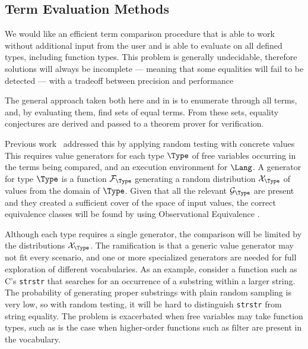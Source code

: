 \subsection{Term Evaluation Methods}
\label{screening:evaluation}

We would like an efficient term comparison procedure that is able to work without additional input from the user and is able to evaluate on all defined types, including function types.
This problem is generally undecidable, therefore solutions will always be incomplete --- meaning that
some equalities will fail to be detected --- with a tradeoff between precision and performance

The general approach taken both here and in \cite{ICAD2013:Claessen} is to enumerate through all terms, and, by evaluating them, find sets of equal terms.
From these sets, equality conjectures are derived and passed to a theorem prover for verification.

Previous work~\cite{JFP2017:Smallbone} addressed this by applying random testing with concrete values %
This requires value generators for each type $\Type$ of free variables occurring in the terms being compared, and an execution environment for $\Lang$.
A generator for type $\Type$ is a function $\mathcal{F}_\Type$ generating a random distribution $\mathcal{X}_\Type$ of values from the domain of $\Type$. 
Given that all the relevant $\mathcal{G}_\Type$ are present and they created a sufficient cover of the space of input values, the correct equivalence classes will be found by using Observational Equivalence \cite{CAV2103:Albarghouthi}. %

Although each type requires a single generator, the comparison will be limited by the distributions $\mathcal{X}_\Type$. 
The ramification is that a generic value generator may not fit every scenario, and one or more specialized generators are needed for full exploration of different vocabularies.
As an example, consider a function such as C's \texttt{strstr} that searches for an occurrence of a substring within a larger string.
The probability of generating proper substrings with plain random sampling is very low, so with
random testing, it will be hard to distinguish \texttt{strstr} from string equality.
The problem is exacerbated when free variables may take function types, such as is the case when
higher-order functions such as $\textrm{filter}$ are present in the vocabulary.

